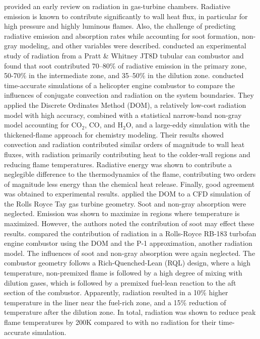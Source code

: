 \citet{Lefebvre1984FlameChambers} provided an early review on radiation in gas-turbine chambers. Radiative emission is known to contribute significantly to wall heat flux, in particular for high pressure and highly luminous flames. Also, the challenge of predicting radiative emission and absorption rates while accounting for soot formation, non-gray modeling, and other variables were described. \citet{Claus1981SpectralCombustor} conducted an experimental study of radiation from a Pratt \& Whitney JT8D tubular can combustor and found that soot contributed 70–80\% of radiative emission in the primary zone, 50-70\% in the intermediate zone, and 35–50\% in the dilution zone.
\citet{Berger2016OnLoads} conducted time-accurate simulations of a helicopter engine combustor to compare the influences of conjugate convection and radiation on the system boundaries. They applied the Discrete Ordinates Method (DOM), a relatively low-cost radiation model with high accuracy, combined with a statistical narrow-band non-gray model accounting for CO$_2$, CO, and H$_2$O, and a large-eddy simulation with the thickened-flame approach for chemistry modeling. Their results showed convection and radiation contributed similar orders of magnitude to wall heat fluxes, with radiation primarily contributing heat to the colder-wall regions and reducing flame temperatures. Radiative energy was shown to contribute a neglegible difference to the thermodynamics of the flame, contributing two orders of magnitude less energy than the chemical heat release. Finally, good agreement was obtained to experimental results. 
\citet{Paul2006RadiativeCombustor} applied the DOM to a CFD simulation of the Rolls Royce Tay gas turbine geometry. Soot and non-gray absorption were neglected. Emission was shown to maximize in regions where temperature is maximized. However, the authors noted the contribution of soot may effect these results.
\citet{Gamil2020AssessmentChamber} compared the contribution of radiation in a Rolls-Royce RB-183 turbofan engine combustor using the DOM and the P-1 approximation, another radiation model. The influences of soot and non-gray absorption were again neglected.
The combustor geometry follows a Rich-Quenched-Lean (RQL) design, where a high temperature, non-premixed flame is followed by a high degree of mixing with dilution gases, which is followed by a premixed fuel-lean reaction to the aft section of the combustor.
Apparently, radiation resulted in a 10\% higher temperature in the liner near the fuel-rich zone, and a 15\% reduction of temperature after the dilution zone.
In total, radiation was shown to reduce peak flame temperatures by 200K compared to with no radiation for their time-accurate simulation.
